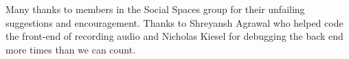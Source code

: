 \begin{acks}
Many thanks to members in the Social Spaces group for their unfailing suggestions and encouragement. Thanks to Shreyansh Agrawal who helped code the front-end of recording audio and Nicholas Kiesel for debugging the back end more times than we can count.
\end{acks}